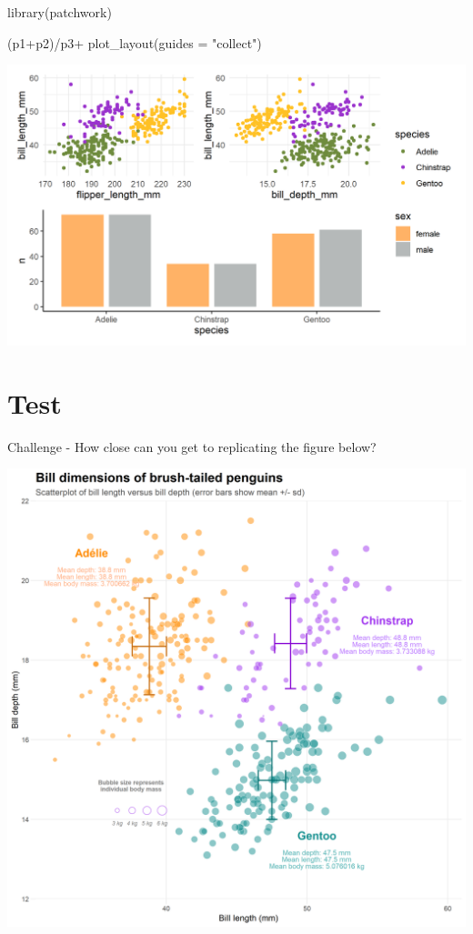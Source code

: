 \documentclass[
]{book}
\makeatletter
\newenvironment{Shaded}{\begin{snugshade}}{\end{snugshade}}
\newcommand{\AttributeTok}[1]{\textcolor[rgb]{0.77,0.63,0.00}{#1}}
\newcommand{\FunctionTok}[1]{\textcolor[rgb]{0.00,0.00,0.00}{#1}}
\newcommand{\NormalTok}[1]{#1}
\newcommand{\SpecialCharTok}[1]{\textcolor[rgb]{0.00,0.00,0.00}{#1}}
\newcommand{\StringTok}[1]{\textcolor[rgb]{0.31,0.60,0.02}{#1}}
\newenvironment{kframe}{%
\medskip{}
\setlength{\fboxsep}{.8em}
 \def\at@end@of@kframe{}%
 \ifinner\ifhmode%
  \def\at@end@of@kframe{\end{minipage}}%
  \begin{minipage}{\columnwidth}%
 \fi\fi%
 \def\FrameCommand##1{\hskip\@totalleftmargin \hskip-\fboxsep
 \colorbox{shadecolor}{##1}\hskip-\fboxsep
     \hskip-\linewidth \hskip-\@totalleftmargin \hskip\columnwidth}%
 \MakeFramed {\advance\hsize-\width
   \@totalleftmargin\z@ \linewidth\hsize
   \@setminipage}}%
 {\par\unskip\endMakeFramed%
 \at@end@of@kframe}
\newenvironment{block}[1]
  {
  \begin{itemize}
  \renewcommand{\labelitemi}{
    \raisebox{-.7\height}[0pt][0pt]{
      {\setkeys{Gin}{width=3em,keepaspectratio}\texttt{[image: images/\#1]}}
    }
  }
  \setlength{\fboxsep}{1em}
  \begin{kframe}
  \item
  }
  {
  \end{kframe}
  \end{itemize}
  }
\newenvironment{rmdquestion}
  {\begin{block}{question}}
  {\end{block}}
\makeatother
\begin{document}
\begin{Shaded}
\begin{Highlighting}[]
\FunctionTok{library}\NormalTok{(patchwork)}

\NormalTok{ (p1}\SpecialCharTok{+}\NormalTok{p2)}\SpecialCharTok{/}\NormalTok{p3}\SpecialCharTok{+}
  \FunctionTok{plot\_layout}\NormalTok{(}\AttributeTok{guides =} \StringTok{"collect"}\NormalTok{) }
\end{Highlighting}
\end{Shaded}

\includegraphics[width=0.9\linewidth]{images/patchwork}

\hypertarget{test}{%
\section{Test}\label{test}}

\begin{rmdquestion}
Challenge - How close can you get to replicating the figure below?
\end{rmdquestion}

\includegraphics[width=1\linewidth]{images/ambitious}
\end{document}
